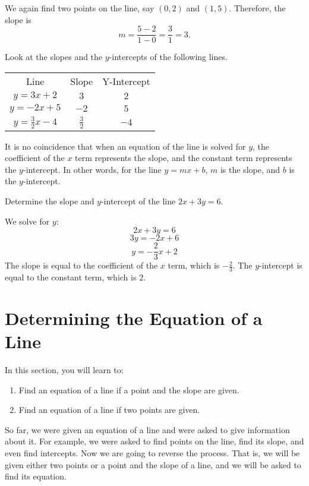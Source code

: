 \begin{solution} We again find two points on the line, say $(0, 2)$ and $(1, 5)$.
Therefore, the slope is
\[ m = \frac{5 - 2}{1 - 0} = \frac{3}{1} = 3.\]
\end{solution}
Look at the slopes and the $y$-intercepts of the following lines.
\begin{center}

\begin{tabular}{ccc}
Line & Slope & Y-Intercept \\
$y = 3x + 2$ & $3$ & $2$ \\
$y = -2x + 5$ & $-2$ & $5$ \\
$y = \frac{3}{2}x - 4$ & $\frac{3}{2}$ & $-4$
\end{tabular}
\end{center}

It is no coincidence that when an equation of the line is solved for $y$, the coefficient of the $x$ term represents the slope, and the constant term represents the $y$-intercept.
In other words, for the line $y = mx + b$, $m$ is the slope, and $b$ is the $y$-intercept.

\begin{example}
Determine the slope and $y$-intercept of the line $2x + 3y = 6$.
\end{example}

\begin{solution}
We solve for $y$:
\[2x + 3y = 6\]
\[3y = -2x + 6\]
\[y = -\frac{2}{3}x + 2\]
The slope is equal to the coefficient of the $x$ term, which is $-\frac{2}{3}$.
The $y$-intercept is equal to the constant term, which is $2$.
\end{solution}



\section{Determining the Equation of a Line}

In this section, you will learn to:
\begin{enumerate}
    \item Find an equation of a line if a point and the slope are given.
    \item Find an equation of a line if two points are given.
\end{enumerate}

So far, we were given an equation of a line and were asked to give information about it. For example, we were asked to find points on the line, find its slope, and even find intercepts. Now we are going to reverse the process. That is, we will be given either two points or a point and the slope of a line, and we will be asked to find its equation.

